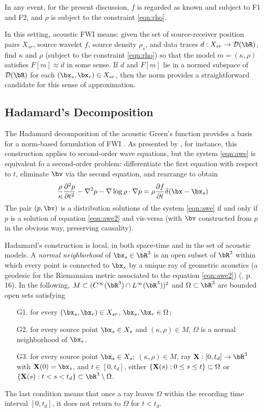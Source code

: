In any event, for the present discussion, $f$ is regarded
as known and subject to F1 and F2, and $\rho$ is subject to the constraint \ref{eqn:rho}.

In this setting, acoustic FWI means: given the set of
source-receiver position pairs $X_{sr}$, source wavelet
$f$,  source density $\rho_s$, and data traces
$d:  X_{sr} \rightarrow \cal{D}(\bR)$, find $\kappa$ and $\rho$
(subject to the constraint \ref{eqn:rho}) so that the model
$m=(\kappa,\rho)$ satisfies $F[m] \approx d$ in some sense. If
$d$ and $F[m]$ lie in a normed subspace of $\cal{D}(\bR)$ for each
$(\bx_s,\bx_r) \in X_{sr}$, then the
norm provides a straightforward candidate for this sense of
approximation.

\subsection{Hadamard's Decomposition}
The Hadamard decomposition of the acoustic Green's function provides a
basis for a norm-based formulation of FWI \cite[]{Friedlander:75,Qian:JCP24}. As presented by
\cite{Friedlander:75}, for instance, this construction applies to
second-order wave equations, but the system \ref{eqn:awe} is
equivalent fo a second-order problem: differentiate the first equation
with respect to $t$, eliminate $\bv$ via the second equation, and
rearrange to obtain
\begin{equation}
  \label{eqn:awe2}
  \frac{\rho}{\kappa}\frac{\partial^2 p}{\partial t^2} - \nabla^2 p -
  \nabla \log \rho \cdot \nabla p = \rho \frac{\partial f}{\partial t}
  \delta(\bx-\bx_s)
\end{equation}
The pair $(p,\bv)$ is a distribution solutions of the system
\ref{eqn:awe} if and only if $p$ is a solution of equation
\ref{eqn:awe2} and vis-versa (with $\bv$ constructed from $p$ in the
obvious way, preserving causality).

Hadamard's construction is local, in both space-time and in the set of
acoustic models. A {\em normal neighborhood} of
$\bx_s \in \bR^3$ is an open subset of $\bR^3$ 
within which every point is connected to $\bx_s$ by  a unique ray of
geometric acoustics (a geodesic for the Riemannian metric associated
to the equation \ref{eqn:awe2}) (\cite{Friedlander:75}, p. 16). In the
following, 
$M \subset (C^{\infty}(\bR^3) \cap L^{\infty}(\bR^3))^2$ and $\Omega
\subset \bR^3$ are bounded open sets satisfying 
\begin{itemize}
  \item[G1. ] for every $(\bx_s,\bx_r) \in X_{sr}$, $\bx_s, \bx_r \in \Omega$;
  \item[G2. ] for every source point $\bx_s\in X_{s}$ and $(\kappa,\rho) \in M$, $\Omega$ is a
    normal neighborhood of $\bx_s$.
  \item[G3. ] for every source point $\bx_s \in X_{s};$
    $(\kappa,\rho) \in M$, ray ${\bf X}: [0,t_d] \rightarrow \bR^3$
    with ${\bf X}(0)=\bx_s$, and
    $t \in [0,t_d]$, either $\{{\bf X}(s): 0\le s \le t\} \subset \Omega$
    or $\{{\bf X}(s): t < s < t_d\} \subset \bR^3 \setminus \Omega$.
  \end{itemize}
The last condition means that once a ray leaves $\Omega$ within the
recording time interval $[0,t_d]$, it does not return to $\Omega$
for $t<t_d$.

